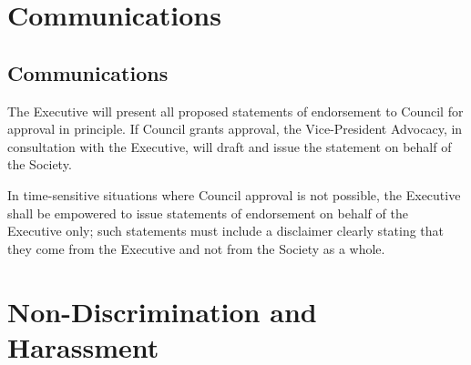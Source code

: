\section{Communications}
\subsection{Communications}
\begin{longenum}[ label*=\thesection.\arabic*., align=left]
	\item The Executive will present all proposed statements of endorsement to Council for approval in principle. If Council grants approval, the Vice-President Advocacy, in consultation with the Executive, will draft and issue the statement on behalf of the Society. 
    \item In time-sensitive situations where Council approval is not possible, the Executive shall be empowered to issue statements of endorsement on behalf of the Executive only; such statements must include a disclaimer clearly stating that they come from the Executive and not from the Society as a whole. 
\end{longenum}
\newpage

\section{Non-Discrimination and Harassment}



